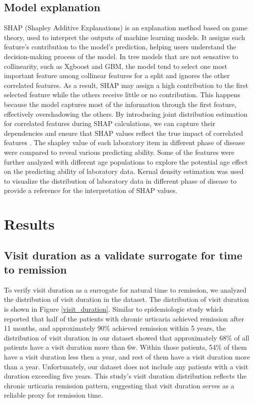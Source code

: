 \documentclass[final,3p,times,authoryear]{elsarticle}
\begin{document}
\subsection{Model explanation}\label{ModelExplanationMethods}
SHAP (Shapley Additive Explanations) is an explanation method based on game theory, used to interpret the outputs of machine learning models. It assigns each feature's contribution to the model's prediction, helping users understand the decision-making process of the model. In tree models that are not sensative to collinearity, such as Xgboost and GBM, the model tend to select one most important feature among collinear features for a split and ignores the other correlated features. As a result, SHAP may assign a high contribution to the first selected feature while the others receive little or no contribution. This happens because the model captures most of the information through the first feature, effectively overshadowing the others. By introducing joint distribution estimation for correlated features during SHAP calculations, we can capture their dependencies and ensure that SHAP values reflect the true impact of correlated features \citep{lundberg2017unified}.
The shapley value of each laboratory item in different phase of disease were compared to reveal various predicting ability. Some of the features were further analyzed with different age populations to explore the potential age effect on the predicting ability of laboratory data. 
Kernal density estimation was used to visualize the distribution of laboratory data in different phase of disease to provide a reference for the interpretation of SHAP values.


\section{Results}\label{Results}
\subsection{Visit duration as a validate surrogate for time to remission}\label{surrogate}

To verify visit duration as a surrogate for natural time to remission, we analyzed the distribution of visit duration in the dataset. The distribution of visit duration is shown in Figure \ref{visit_duration}. Similar to epidemiologic study which reported that half of the patients with chronic urticaria achieved remission after 11 months, and approximately 90\% achieved remission within 5 years\citep{eun2019natural}, the distribution of visit duration in our dataset showed that approximately 68\% of all patients have a visit duration more than 6w. Within those patients, 54\% of them have a visit duration less then a year, and rest of them have a visit duration more than a year. Unfortunately, our dataset does not include any patients with a visit duration exceeding five years. This study's visit duration distribution reflects the chronic urticaria remission pattern, suggesting that visit duration serves as a reliable proxy for remission time.
\end{document}
